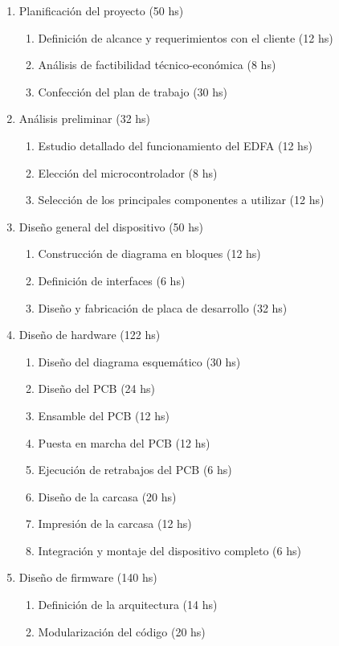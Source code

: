 \documentclass[
11pt, %
codirector, %
]{charter}
\begin{document}
\begin{enumerate}
\item Planificación del proyecto (50 hs)
	\begin{enumerate}
	\item Definición de alcance y requerimientos con el cliente (12 hs)
	\item Análisis de factibilidad técnico-económica (8 hs)
	\item Confección del plan de trabajo (30 hs)
	\end{enumerate}
\item Análisis preliminar (32 hs)
	\begin{enumerate}
	\item Estudio detallado del funcionamiento del EDFA (12 hs)
	\item Elección del microcontrolador (8 hs)
	\item Selección de los principales componentes a utilizar (12 hs)
	\end{enumerate}
\item Diseño general del dispositivo (50 hs)
	\begin{enumerate}
	\item Construcción de diagrama en bloques (12 hs)
	\item Definición de interfaces (6 hs)
	\item Diseño y fabricación de placa de desarrollo (32 hs)
	\end{enumerate}
\item Diseño de hardware (122 hs)
	\begin{enumerate}
	\item Diseño del diagrama esquemático (30 hs)
	\item Diseño del PCB (24 hs)
	\item Ensamble del PCB (12 hs)
	\item Puesta en marcha del PCB (12 hs)
	\item Ejecución de retrabajos del PCB (6 hs)
	\item Diseño de la carcasa (20 hs)
	\item Impresión de la carcasa (12 hs)
	\item Integración y montaje del dispositivo completo (6 hs)
	\end{enumerate}
\item Diseño de firmware (140 hs)
	\begin{enumerate}
	\item Definición de la arquitectura (14 hs)
	\item Modularización del código (20 hs)

\end{enumerate}
\end{enumerate}
\end{document}
